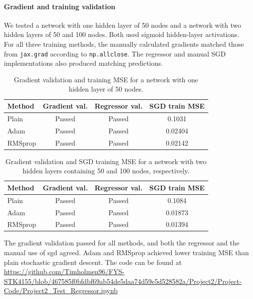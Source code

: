 \paragraph{Gradient and training validation}
We tested a network with one hidden layer of 50 nodes and a network with two
hidden layers of 50 and 100 nodes. Both used sigmoid hidden-layer
activations. For all three training methods, the manually calculated
gradients matched those from \texttt{jax.grad} according to
\texttt{np.allclose}. The regressor and manual SGD implementations also
produced matching predictions.

\begin{table}[htbp]
    \centering
    \caption{Gradient validation and training MSE for a network with one
    hidden layer of 50 nodes.}
    \label{tab:regressor-val}
    \begin{tabular}{lccc}
        \hline
        Method & Gradient val. & Regressor val. & SGD train MSE\\
        \hline
        Plain   & Passed & Passed & 0.1031 \\
        Adam    & Passed & Passed & 0.02404  \\
        RMSprop & Passed & Passed & 0.02142  \\
        \hline
    \end{tabular}
\end{table}
\begin{table}[htbp]
    \centering
    \caption{Gradient validation and SGD training MSE for a network with
    two hidden layers containing 50 and 100 nodes, respectively.}
    \label{tab:regressor-val-two-layers}
    \begin{tabular}{lccc}
        \hline
        Method & Gradient val. & Regressor val. & SGD train MSE \\
        \hline
        Plain   & Passed & Passed & 0.1084  \\
        Adam    & Passed & Passed & 0.01873 \\
        RMSprop & Passed & Passed & 0.01394 \\
        \hline
    \end{tabular}
\end{table}
The gradient validation passed for all methods, and both the regressor and the
manual use of sgd agreed. Adam and RMSprop achieved lower training 
MSE than plain stochastic gradient descent. The code can be found at
\url{https://github.com/Timholmen96/FYS-STK4155/blob/467585f0bfdbf69ab54de5daa74d59e5d528582a/Project2/Project-Code/Project2_Test_Regressor.ipynb}
